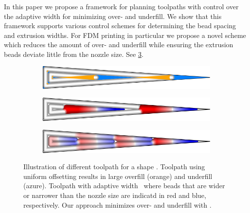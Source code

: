In this paper we propose a framework for planning toolpaths with control over the adaptive width for minimizing over- and underfill. 
We show that this framework supports various control schemes for determining the bead spacing and extrusion widths. 
For FDM printing in particular we propose a novel scheme which reduces the amount of over- and underfill while ensuring the extrusion beads deviate little from the nozzle size.
See \cref{intro_wedge_distributed}. 


\begin{figure}\centering
\setlength{\figwidth}{.9\columnwidth}
\setlength{\figwidthTwo}{.05\columnwidth}
\begin{subfigure}{\figwidth}\centering
\parbox[b]{\figwidthTwo}{\subcaption{}\label{intro_wedge_uniform}}\includegraphics[width=\figwidth]{sources-intro-TEST-naive-accuracy.png}
\end{subfigure}
\begin{subfigure}{\figwidth}\centering
\parbox[b]{\figwidthTwo}{\subcaption{}\label{intro_wedge_centered}}\includegraphics[width=\figwidth]{sources-intro-TEST-Center-widths.png}
\end{subfigure}
\begin{subfigure}{\figwidth}\centering
\parbox[b]{\figwidthTwo}{\subcaption{}\label{intro_wedge_distributed}}\includegraphics[width=\figwidth]{sources-intro-TEST-Distributed-widths.png}
\end{subfigure}
\caption{
Illustration of different toolpath for a shape .
 Toolpath using uniform offsetting results in large overfill (orange) and underfill (azure).
 Toolpath with adaptive width~\cite{Jin2017JMS} where beads that are wider or narrower than the nozzle size are indicatd in red and blue, respectively.
 Our approach minimizes over- and underfill with .
}
\label{intro_wedge}
\end{figure}


